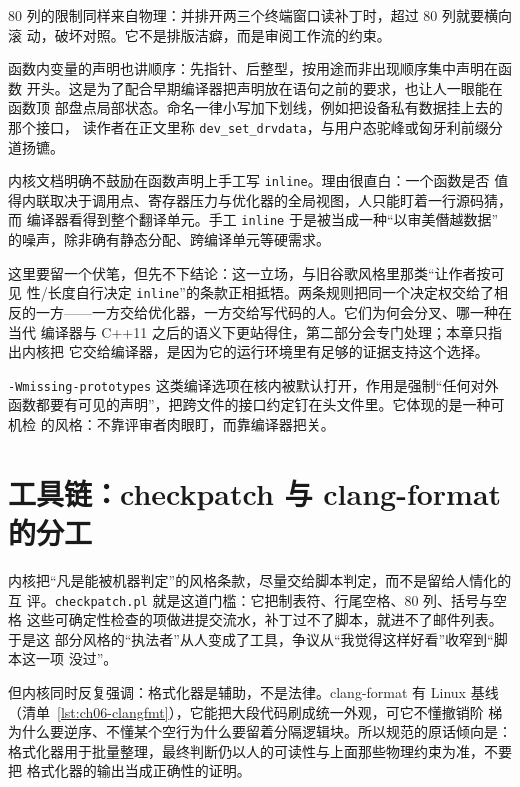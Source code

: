 \documentclass[12pt,a4paper,fontset=fandol]{ctexbook}
\newcommand{\cpp}[1]{C++#1}
\newcommand{\Tp}[1]{\texttt{#1}}
\begin{document}
80 列的限制同样来自物理：并排开两三个终端窗口读补丁时，超过 80 列就要横向滚
动，破坏对照。它不是排版洁癖，而是审阅工作流的约束。

函数内变量的声明也讲顺序：先指针、后整型，按用途而非出现顺序集中声明在函数
开头。这是为了配合早期编译器把声明放在语句之前的要求，也让人一眼能在函数顶
部盘点局部状态。命名一律小写加下划线，例如把设备私有数据挂上去的那个接口，
读作者在正文里称 \Tp{dev\_set\_drvdata}，与用户态驼峰或匈牙利前缀分道扬镳。

\begin{note}[title={内联判据交给编译器，而不是人}]
内核文档明确不鼓励在函数声明上手工写 \Tp{inline}。理由很直白：一个函数是否
值得内联取决于调用点、寄存器压力与优化器的全局视图，人只能盯着一行源码猜，而
编译器看得到整个翻译单元。手工 \Tp{inline} 于是被当成一种``以审美僭越数据''
的噪声，除非确有静态分配、跨编译单元等硬需求。
\end{note}

这里要留一个伏笔，但先不下结论：这一立场，与旧谷歌风格里那类``让作者按可见
性/长度自行决定 \Tp{inline}''的条款正相抵牾。两条规则把同一个决定权交给了相
反的一方——一方交给优化器，一方交给写代码的人。它们为何会分叉、哪一种在当代
编译器与 \cpp{11} 之后的语义下更站得住，第二部分会专门处理；本章只指出内核把
它交给编译器，是因为它的运行环境里有足够的证据支持这个选择。

\Tp{-Wmissing-prototypes} 这类编译选项在核内被默认打开，作用是强制``任何对外
函数都要有可见的声明''，把跨文件的接口约定钉在头文件里。它体现的是一种可机检
的风格：不靠评审者肉眼盯，而靠编译器把关。

\section{工具链：checkpatch 与 clang-format 的分工}
\label{sec:ch06-toolchain}

内核把``凡是能被机器判定''的风格条款，尽量交给脚本判定，而不是留给人情化的互
评。\Tp{checkpatch.pl} 就是这道门槛：它把制表符、行尾空格、80 列、括号与空格
这些可确定性检查的项做进提交流水，补丁过不了脚本，就进不了邮件列表。于是这
部分风格的``执法者''从人变成了工具，争议从``我觉得这样好看''收窄到``脚本这一项
没过''。

但内核同时反复强调：格式化器是辅助，不是法律。clang-format 有 Linux 基线
（清单~\ref{lst:ch06-clangfmt}），它能把大段代码刷成统一外观，可它不懂撤销阶
梯为什么要逆序、不懂某个空行为什么要留着分隔逻辑块。所以规范的原话倾向是：
格式化器用于批量整理，最终判断仍以人的可读性与上面那些物理约束为准，不要把
格式化器的输出当成正确性的证明。
\end{document}
